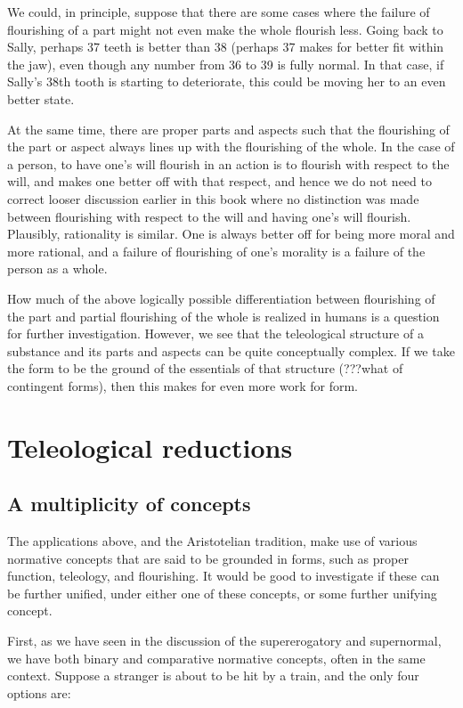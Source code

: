 We could, in principle, suppose that there are some cases where the failure of flourishing of a part might not even make the 
whole flourish less. Going back to Sally, perhaps 37 teeth is better than 38 (perhaps 37 makes for better fit within the jaw),
even though any number from 36 to 39 is fully normal. In that case, if Sally's 38th tooth is starting to deteriorate, this could
be moving her to an even better state. 

At the same time, there are proper parts and aspects such that the flourishing of the part or aspect always lines up with the
flourishing of the whole. In the case of a person, to have one's will flourish in an action is to flourish with respect to the 
will, and makes one better off with that respect, and hence we do not need to correct looser discussion earlier in this book where
no distinction was made between flourishing with respect to the will and having one's will flourish. Plausibly, rationality is similar. 
One is always better off for being more moral and more rational, and a failure of flourishing of one's morality is a failure of the 
person as a whole. 

How much of the above logically possible differentiation between flourishing of the part and partial flourishing of the whole is 
realized in humans is a question for further investigation. However,
we see that the teleological structure of a substance and its parts and aspects can be quite conceptually complex. If we take
the form to be the ground of the essentials of that structure (???what of contingent forms), then this makes for even more work 
for form.

\section{Teleological reductions}
\subsection{A multiplicity of concepts}
The applications above, and the Aristotelian tradition, make use of various normative concepts that are said to be grounded in forms,
such as proper function, teleology, and flourishing. It would be good to investigate if these 
can be further unified, under either one of these concepts, or some further unifying concept.

First, as we have seen in the discussion of the supererogatory and supernormal, we have both binary and comparative normative 
concepts, often in the same context. Suppose a stranger is about to be hit by a train, and the only four options are:

